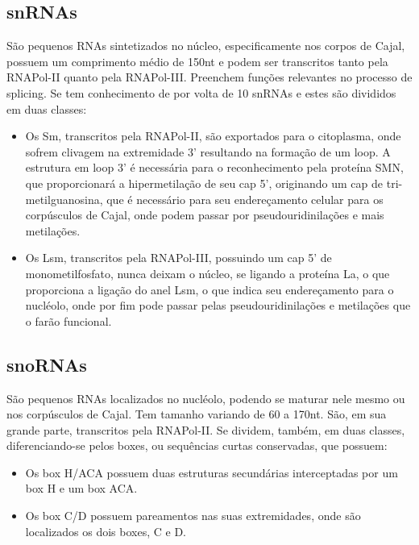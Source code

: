 \documentclass[
]{book}
\begin{document}
\hypertarget{snrnas}{%
\subsection{snRNAs}\label{snrnas}}

São pequenos RNAs sintetizados no núcleo, especificamente nos corpos de Cajal, possuem um comprimento médio de 150nt e podem ser transcritos tanto pela RNAPol-II quanto pela RNAPol-III. Preenchem funções relevantes no processo de splicing. Se tem conhecimento de por volta de 10 snRNAs e estes são divididos em duas classes:

\begin{itemize}
\item
  Os Sm, transcritos pela RNAPol-II, são exportados para o citoplasma, onde sofrem clivagem na extremidade 3' resultando na formação de um loop. A estrutura em loop 3' é necessária para o reconhecimento pela proteína SMN, que proporcionará a hipermetilação de seu cap 5', originando um cap de tri-metilguanosina, que é necessário para seu endereçamento celular para os corpúsculos de Cajal, onde podem passar por pseudouridinilações e mais metilações.
\item
  Os Lsm, transcritos pela RNAPol-III, possuindo um cap 5' de monometilfosfato, nunca deixam o núcleo, se ligando a proteína La, o que proporciona a ligação do anel Lsm, o que indica seu endereçamento para o nucléolo, onde por fim pode passar pelas pseudouridinilações e metilações que o farão funcional.
\end{itemize}

\hypertarget{snornas}{%
\subsection{snoRNAs}\label{snornas}}

São pequenos RNAs localizados no nucléolo, podendo se maturar nele mesmo ou nos corpúsculos de Cajal. Tem tamanho variando de 60 a 170nt. São, em sua grande parte, transcritos
pela RNAPol-II. Se dividem, também, em duas classes, diferenciando-se pelos boxes, ou sequências curtas conservadas, que possuem:

\begin{itemize}
\item
  Os box H/ACA possuem duas estruturas secundárias interceptadas por um box H e um box ACA.
\item
  Os box C/D possuem pareamentos nas suas extremidades, onde são localizados os dois boxes, C e D.
\end{itemize}
\end{document}
